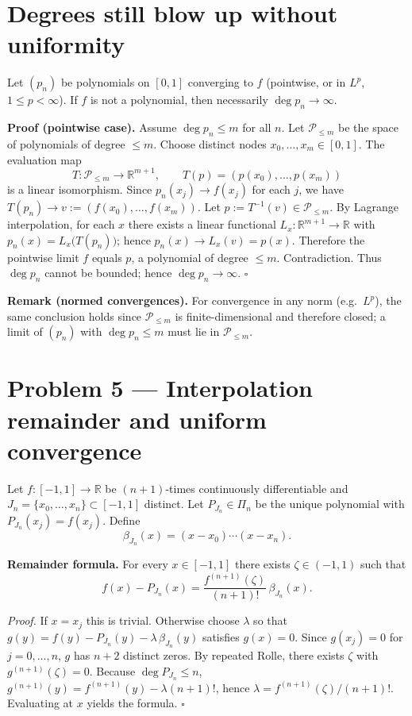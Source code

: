 \documentclass[12pt,a4paper]{article}
\newcommand{\qed}{\hfill$\square$}
\theoremstyle{plain}
\theoremstyle{definition}
\theoremstyle{remark}
\theoremstyle{remark}
\begin{document}
\section*{Degrees still blow up without uniformity}

Let $(p_n)$ be polynomials on $[0,1]$ converging to $f$ (pointwise, or in $L^p$, $1\le p<\infty$).
If $f$ is not a polynomial, then necessarily $\deg p_n\to\infty$.

\smallskip

\noindent\textbf{Proof (pointwise case).}
Assume $\deg p_n\le m$ for all $n$. Let $\mathcal P_{\le m}$ be the space of polynomials of degree $\le m$.
Choose distinct nodes $x_0,\dots,x_m\in[0,1]$. The evaluation map
\[
T:\mathcal P_{\le m}\to\mathbb{R}^{m+1}, \qquad T(p)=(p(x_0),\dots,p(x_m))
\]
is a linear isomorphism. Since $p_n(x_j)\to f(x_j)$ for each $j$, we have $T(p_n)\to v:=(f(x_0),\dots,f(x_m))$.
Let $p:=T^{-1}(v)\in\mathcal P_{\le m}$. By Lagrange interpolation, for each $x$ there exists a linear functional
$L_x:\mathbb{R}^{m+1}\to\mathbb{R}$ with $p_n(x)=L_x\!\big(T(p_n)\big)$; hence
$p_n(x)\to L_x(v)=p(x)$. Therefore the pointwise limit $f$ equals $p$, a polynomial of degree $\le m$.
Contradiction. Thus $\deg p_n$ cannot be bounded; hence $\deg p_n\to\infty$.
\qed

\smallskip

\noindent\textbf{Remark (normed convergences).}
For convergence in any norm (e.g.\ $L^p$), the same conclusion holds since
$\mathcal P_{\le m}$ is finite-dimensional and therefore closed; a limit of $(p_n)$ with $\deg p_n\le m$
must lie in $\mathcal P_{\le m}$.

\section*{Problem 5 — Interpolation remainder and uniform convergence}

Let $f:[-1,1]\to\mathbb{R}$ be $(n+1)$-times continuously differentiable and
$J_n=\{x_0,\dots,x_n\}\subset[-1,1]$ distinct.
Let $P_{J_n}\in\Pi_n$ be the unique polynomial with $P_{J_n}(x_j)=f(x_j)$.
Define
\[
\beta_{J_n}(x)=(x-x_0)\cdots(x-x_n).
\]

\bigskip

\noindent\textbf{Remainder formula.}
For every $x\in[-1,1]$ there exists $\zeta\in(-1,1)$ such that
\[
f(x)-P_{J_n}(x)=\frac{f^{(n+1)}(\zeta)}{(n+1)!}\,\beta_{J_n}(x).
\]

\emph{Proof.}
If $x=x_j$ this is trivial. Otherwise choose $\lambda$ so that
$g(y)=f(y)-P_{J_n}(y)-\lambda\,\beta_{J_n}(y)$ satisfies $g(x)=0$.
Since $g(x_j)=0$ for $j=0,\dots,n$, $g$ has $n+2$ distinct zeros.
By repeated Rolle, there exists $\zeta$ with
$g^{(n+1)}(\zeta)=0$. Because $\deg P_{J_n}\le n$,
$g^{(n+1)}(y)=f^{(n+1)}(y)-\lambda (n+1)!$, hence
$\lambda=f^{(n+1)}(\zeta)/(n+1)!$. Evaluating at $x$ yields the formula. \qed
\end{document}
